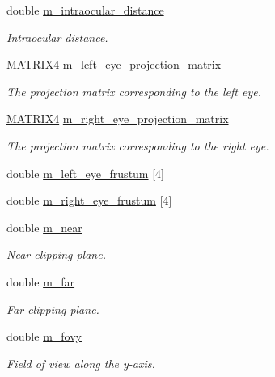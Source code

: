 \begin{DoxyCompactItemize}
\item 
double \hyperlink{class_graphics_1_1_stereo_helper_a13736b824aee087d5a8bc948f8bc700d}{m\_\-intraocular\_\-distance}
\begin{DoxyCompactList}\small\item\em Intraocular distance. \end{DoxyCompactList}\item 
\hyperlink{class_math_1_1_matrix4x4}{MATRIX4} \hyperlink{class_graphics_1_1_stereo_helper_abe0f5805dd94b0d277b00c7d8ce89fd1}{m\_\-left\_\-eye\_\-projection\_\-matrix}
\begin{DoxyCompactList}\small\item\em The projection matrix corresponding to the left eye. \end{DoxyCompactList}\item 
\hyperlink{class_math_1_1_matrix4x4}{MATRIX4} \hyperlink{class_graphics_1_1_stereo_helper_aaf3d810febcca0e5c47bcc1924e8b576}{m\_\-right\_\-eye\_\-projection\_\-matrix}
\begin{DoxyCompactList}\small\item\em The projection matrix corresponding to the right eye. \end{DoxyCompactList}\item 
double \hyperlink{class_graphics_1_1_stereo_helper_a912a430f01899bb0e2ebeec941dc6801}{m\_\-left\_\-eye\_\-frustum} \mbox{[}4\mbox{]}
\item 
double \hyperlink{class_graphics_1_1_stereo_helper_a2542b4e8d37d72b4bb0ed2e7c3bc919f}{m\_\-right\_\-eye\_\-frustum} \mbox{[}4\mbox{]}
\item 
double \hyperlink{class_graphics_1_1_stereo_helper_ab6261035a7d4ed8d7de0a56a53efcaae}{m\_\-near}
\begin{DoxyCompactList}\small\item\em Near clipping plane. \end{DoxyCompactList}\item 
double \hyperlink{class_graphics_1_1_stereo_helper_adaf953e95e951648a78c1be3af5a7245}{m\_\-far}
\begin{DoxyCompactList}\small\item\em Far clipping plane. \end{DoxyCompactList}\item 
double \hyperlink{class_graphics_1_1_stereo_helper_a21f4b593c9629fe91c8f4aa3fdc3fde7}{m\_\-fovy}
\begin{DoxyCompactList}\small\item\em Field of view along the y-\/axis. \end{DoxyCompactList}\item 

\end{DoxyCompactItemize}
